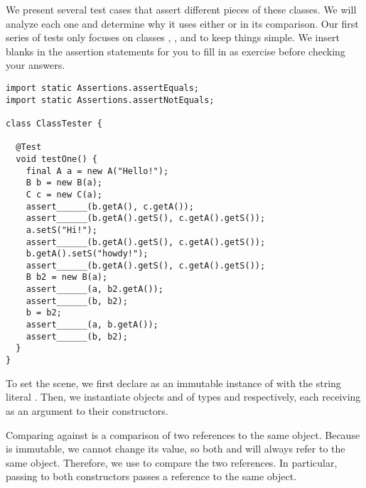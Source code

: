 
We present several test cases that assert different pieces of these classes. We will analyze each one and determine why it uses either  or  in its comparison. Our first series of tests only focuses on classes , , and  to keep things simple. We insert blanks in the assertion statements for you to fill in as exercise before checking your answers.

\begin{lstlisting}[language=MyJava]
import static Assertions.assertEquals;
import static Assertions.assertNotEquals;

class ClassTester {

  @Test
  void testOne() {
    final A a = new A("Hello!");
    B b = new B(a);
    C c = new C(a);
    assert______(b.getA(), c.getA());
    assert______(b.getA().getS(), c.getA().getS());
    a.setS("Hi!");
    assert______(b.getA().getS(), c.getA().getS());
    b.getA().setS("howdy!");
    assert______(b.getA().getS(), c.getA().getS());
    B b2 = new B(a);
    assert______(a, b2.getA());
    assert______(b, b2);
    b = b2;
    assert______(a, b.getA());
    assert______(b, b2);
  }
}
\end{lstlisting}

To set the scene, we first declare  as an immutable instance of  with the string literal . Then, we instantiate objects  and  of types  and  respectively, each receiving  as an argument to their constructors. 

Comparing  against  is a comparison of two references to the same object. Because  is immutable, we cannot change its value, so both  and  will always refer to the same object. Therefore, we use  to compare the two references. In particular, passing  to both constructors passes a reference to the same object.

